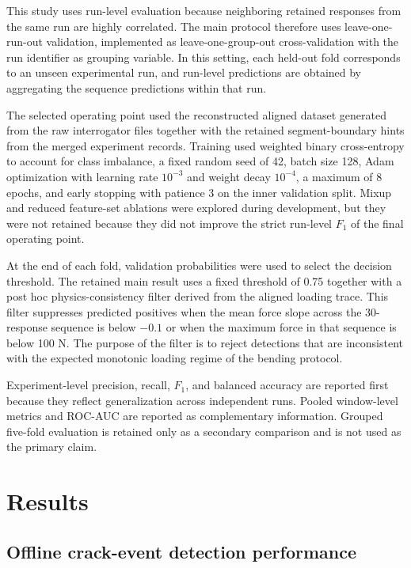 \documentclass[fleqn,10pt]{wlscirep}
\begin{document}
This study uses run-level evaluation because neighboring retained responses from the same run are highly correlated. The main protocol therefore uses leave-one-run-out validation, implemented as leave-one-group-out cross-validation with the run identifier as grouping variable. In this setting, each held-out fold corresponds to an unseen experimental run, and run-level predictions are obtained by aggregating the sequence predictions within that run.

The selected operating point used the reconstructed aligned dataset generated from the raw interrogator files together with the retained segment-boundary hints from the merged experiment records. Training used weighted binary cross-entropy to account for class imbalance, a fixed random seed of 42, batch size 128, Adam optimization with learning rate $10^{-3}$ and weight decay $10^{-4}$, a maximum of 8 epochs, and early stopping with patience 3 on the inner validation split. Mixup and reduced feature-set ablations were explored during development, but they were not retained because they did not improve the strict run-level $F_1$ of the final operating point.

At the end of each fold, validation probabilities were used to select the decision threshold. The retained main result uses a fixed threshold of 0.75 together with a post hoc physics-consistency filter derived from the aligned loading trace. This filter suppresses predicted positives when the mean force slope across the 30-response sequence is below $-0.1$ or when the maximum force in that sequence is below 100 N. The purpose of the filter is to reject detections that are inconsistent with the expected monotonic loading regime of the bending protocol.

Experiment-level precision, recall, $F_1$, and balanced accuracy are reported first because they reflect generalization across independent runs. Pooled window-level metrics and ROC-AUC are reported as complementary information. Grouped five-fold evaluation is retained only as a secondary comparison and is not used as the primary claim.

\section*{Results}

\subsection*{Offline crack-event detection performance}
\end{document}
